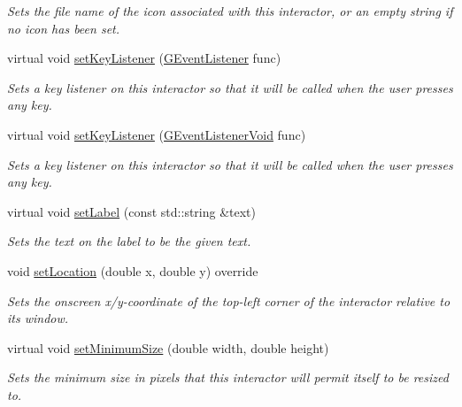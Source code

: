 \begin{DoxyCompactItemize}
\begin{DoxyCompactList}\small\item\em Sets the file name of the icon associated with this interactor, or an empty string if no icon has been set. \end{DoxyCompactList}\item 
virtual void \mbox{\hyperlink{classsgl_1_1GInteractor_aeb8324d3287fa1fbe093f4d6230cf0a6}{set\+Key\+Listener}} (\mbox{\hyperlink{namespacesgl_ae9f3e9eab70035da1a2b114e21357b25}{G\+Event\+Listener}} func)
\begin{DoxyCompactList}\small\item\em Sets a key listener on this interactor so that it will be called when the user presses any key. \end{DoxyCompactList}\item 
virtual void \mbox{\hyperlink{classsgl_1_1GInteractor_ae48ecea73606c7bd9423e1c7cc589cc9}{set\+Key\+Listener}} (\mbox{\hyperlink{namespacesgl_a54427ce97bb1c2804e4fe2b0a62e8b17}{G\+Event\+Listener\+Void}} func)
\begin{DoxyCompactList}\small\item\em Sets a key listener on this interactor so that it will be called when the user presses any key. \end{DoxyCompactList}\item 
virtual void \mbox{\hyperlink{classsgl_1_1GLabel_a4af0be0e092d87271c1432624bc00080}{set\+Label}} (const std\+::string \&text)
\begin{DoxyCompactList}\small\item\em Sets the text on the label to be the given text. \end{DoxyCompactList}\item 
void \mbox{\hyperlink{classsgl_1_1GLabel_ae3b17c0aeb355dc23c4e4cbf066e81f7}{set\+Location}} (double x, double y) override
\begin{DoxyCompactList}\small\item\em Sets the onscreen x/y-\/coordinate of the top-\/left corner of the interactor relative to its window. \end{DoxyCompactList}\item 
virtual void \mbox{\hyperlink{classsgl_1_1GInteractor_a0cf428e207b7f22cc08138a90b1b87b2}{set\+Minimum\+Size}} (double width, double height)
\begin{DoxyCompactList}\small\item\em Sets the minimum size in pixels that this interactor will permit itself to be resized to. \end{DoxyCompactList}\item 

\end{DoxyCompactItemize}
